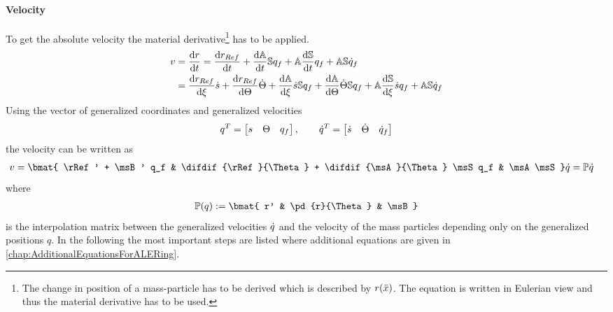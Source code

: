 \paragraph{Velocity}
To get the absolute velocity the material derivative\footnote{The change in position of a mass-particle has to be derived which is described by $r(\bar{x})$. The equation is written in Eulerian view and thus the material derivative has to be used.} has to be applied.
%
\begin{align*}
  v &= \frac{\mathrm{d} r}{\mathrm{d} t} = \frac{\mathrm{d} r _{Ref}}{\mathrm{d} t} + \frac{\mathrm{d} \mathbb{A}}{\mathrm{d} t} \mathbb{S} q_{f } + \mathbb{A} \frac{\mathrm{d} \mathbb{S}}{\mathrm{d} t} q_{f } + \mathbb{A} \mathbb{S} \dot{q} _{f} \\
  &= \frac{\mathrm{d} r _{Ref}}{\mathrm{d} \xi} \dot{s} + \frac{\mathrm{d} r _{Ref}}{\mathrm{d} \Theta} \dot{\Theta} + \frac{\mathrm{d} \mathbb{A}}{\mathrm{d} \xi} \dot{s} \mathbb{S} q_f + \frac{\mathrm{d} \mathbb{A}}{\mathrm{d} \Theta} \dot{\Theta} \mathbb{S} q_{f } + \mathbb{A} \frac{\mathrm{d} \mathbb{S}}{\mathrm{d} \xi} \dot{s} q_{f } + \mathbb{A} \mathbb{S} \dot{q} _{f}
\end{align*}
%
Using the vector of generalized coordinates and generalized velocities
%
\begin{align}
  q^T =
  \begin{bmatrix}
    s & \Theta & q_{f }
  \end{bmatrix}, \qquad \dot{q}^T =
  \begin{bmatrix}
    \dot{s} & \dot{\Theta} & \dot{q} _{f}
  \end{bmatrix}
\end{align}
%
the velocity can be written as
%
\begin{align}
  v &= \bmat{ \rRef' + \msB' q_f & \difdif{\rRef}{\Theta} + \difdif{\msA}{\Theta} \msS q_f & \msA \msS } \dotq = \msP \dotq \label{eq:TranformationGeneralizedVelToRealVel}
\end{align}
%
where
%
\begin{align}
  \label{eq:DefinitionOfP}
  \msP(q) := \bmat{ r' & \pd{r}{\Theta} & \msB}
\end{align}
%
is the interpolation matrix between the generalized velocities $\dot{q}$ and the velocity of the mass particles depending only on the generalized positions $q$.
In the following the most important steps are listed where additional equations are given in \cref{chap:AdditionalEquationsForALERing}.

